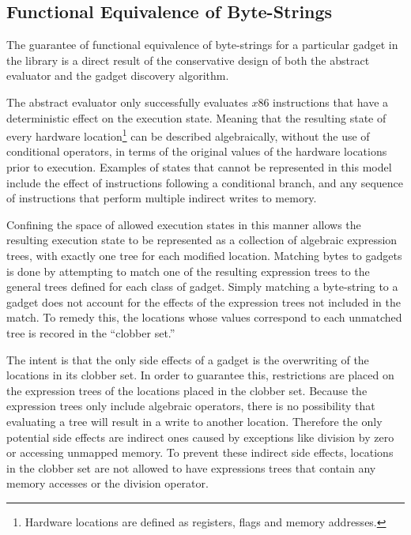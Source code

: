     \subsection{Functional Equivalence of Byte-Strings}
    \label{sec:results-gadget-inst-eq}

        The guarantee of functional equivalence of byte-strings for a
        particular gadget in the library is a direct result of the
        conservative design of both the abstract evaluator and the gadget
        discovery algorithm.

        The abstract evaluator only successfully evaluates $x86$ instructions
        that have a deterministic effect on the execution state.  Meaning that
        the resulting state of every hardware location\footnote{Hardware
        locations are defined as registers, flags and memory addresses.} can be
        described algebraically, without the use of conditional operators, in
        terms of the original values of the hardware locations prior to
        execution. Examples of states that cannot be represented in this model
        include the effect of instructions following a conditional branch, and
        any sequence of instructions that perform multiple indirect writes to
        memory.

        Confining the space of allowed execution states in this manner allows
        the resulting execution state to be represented as a collection of
        algebraic expression trees, with exactly one tree for each modified
        location. Matching bytes to gadgets is done by attempting to match one
        of the resulting expression trees to the general trees defined for each
        class of gadget. Simply matching a byte-string to a gadget does not
        account for the effects of the expression trees not included in the
        match.  To remedy this, the locations whose values correspond to each
        unmatched tree is recored in the ``clobber set.''

        The intent is that the only side effects of a gadget is the overwriting
        of the locations in its clobber set. In order to guarantee this,
        restrictions are placed on the expression trees of the locations placed
        in the clobber set. Because the expression trees only include algebraic
        operators, there is no possibility that evaluating a tree will result in
        a write to another location. Therefore the only potential side effects
        are indirect ones caused by exceptions like division by zero or
        accessing unmapped memory. To prevent these indirect side effects,
        locations in the clobber set are not allowed to have expressions trees
        that contain any memory accesses or the division operator.

